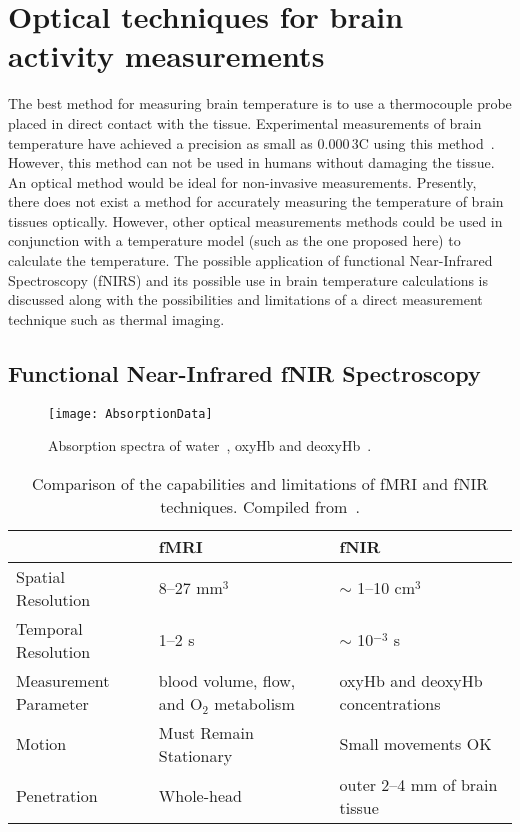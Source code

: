 \chapter{Optical techniques for brain activity measurements}
\label{ch:detectors}
The best method for measuring brain temperature is to use a thermocouple probe placed in direct contact with the tissue.  Experimental measurements of brain temperature have achieved a precision as small as $0.000\,3$\degree C using this method~\citep{mcelligott}. However, this method can not be used in humans without damaging the tissue.  An optical method would be ideal for non-invasive measurements.  Presently, there does not exist a method for accurately measuring the temperature of brain tissues optically.  However, other optical measurements methods could be used in conjunction with a temperature model (such as the one proposed here) to calculate the temperature.  The possible application of functional Near-Infrared Spectroscopy (fNIRS) and its possible use in brain temperature calculations is discussed along with the possibilities and limitations of a direct measurement technique such as thermal imaging.
  
\section{{F}unctional {N}ear-{I}nfrared {fNIR} Spectroscopy}
\begin{figure}[tb]
  \begin{center}
    \texttt{[image: AbsorptionData]}
    \caption[Absorption spectra of water, deoxyhemoglobin and oxyhemoblogin]{\label{fig:fnirabsorption} Absorption spectra of water~\citet{cope}, oxyHb and deoxyHb~\citet{horecker}.}
  \end{center}
\end{figure}
\begin{table*}[tb]
  \begin{tabular*}{\linewidth}{lp{5cm}p{5cm}}
    \toprule
                         & fMRI             & fNIR            \\
    \midrule
    Spatial Resolution   & 8--27 mm$^3$  & $\sim$ 1--10 cm$^3$ \\
    Temporal Resolution  & 1--2 s        & $\sim$ 10$^{-3}$ s \\
    Measurement Parameter& blood volume, flow, and O$_2$ metabolism & oxyHb and deoxyHb concentrations \\
    Motion               & Must Remain Stationary & Small movements OK \\
    Penetration          & Whole-head    & outer 2--4 mm of brain tissue \\
    \bottomrule
  \end{tabular*}
  \caption[Comparison of fMRI and fNIR]{\label{tbl:comaparemethods}Comparison of the capabilities and limitations of fMRI and fNIR techniques.  Compiled from~\citet{bunce2006,elliott}.}
\end{table*}

